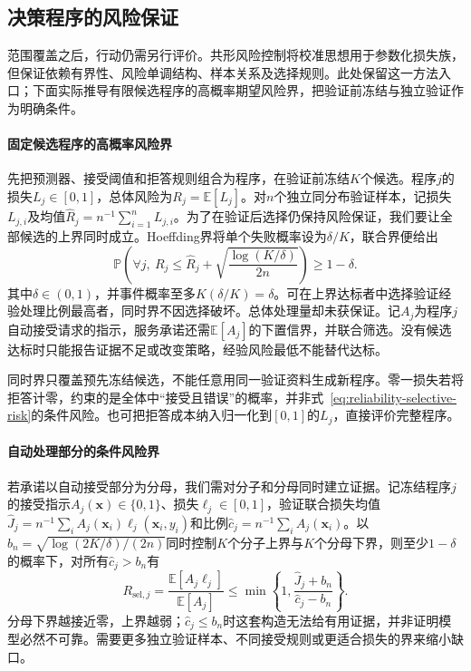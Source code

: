 \subsection{决策程序的风险保证}

范围覆盖之后，行动仍需另行评价。共形风险控制将校准思想用于参数化损失族，但保证依赖有界性、风险单调结构、样本关系及选择规则。此处保留这一方法入口；下面实际推导有限候选程序的高概率期望风险界，把验证前冻结与独立验证作为明确条件。

\paragraph{固定候选程序的高概率风险界}

先把预测器、接受阈值和拒答规则组合为程序，在验证前冻结$K$个候选。程序$j$的损失$L_j\in[0,1]$，总体风险为$R_j=\mathbb E[L_j]$。对$n$个独立同分布验证样本，记损失$L_{j,i}$及均值$\hat R_j=n^{-1}\sum_{i=1}^{n}L_{j,i}$。为了在验证后选择仍保持风险保证，我们要让全部候选的上界同时成立。Hoeffding界将单个失败概率设为$\delta/K$，联合界便给出
\begin{equation}
 \mathbb P\left(
  \forall j,\ R_j\leq
  \hat R_j+\sqrt{\frac{\log(K/\delta)}{2n}}
 \right)\geq1-\delta.
 \label{eq:reliability-finite-program-bound}
\end{equation}
其中$\delta\in(0,1)$，并事件概率至多$K(\delta/K)=\delta$。可在上界达标者中选择验证经验处理比例最高者，同时界不因选择破坏。总体处理量却未获保证。记$A_j$为程序$j$自动接受请求的指示，服务承诺还需$\mathbb E[A_j]$的下置信界，并联合筛选。没有候选达标时只能报告证据不足或改变策略，经验风险最低不能替代达标。

同时界只覆盖预先冻结候选，不能任意用同一验证资料生成新程序。零一损失若将拒答计零，约束的是全体中“接受且错误”的概率，并非式~\eqref{eq:reliability-selective-risk}的条件风险。也可把拒答成本纳入归一化到$[0,1]$的$L_j$，直接评价完整程序。

\paragraph{自动处理部分的条件风险界}

若承诺以自动接受部分为分母，我们需对分子和分母同时建立证据。记冻结程序$j$的接受指示$A_j(\bm{x})\in\{0,1\}$、损失$\ell_j\in[0,1]$，验证联合损失均值$\hat J_j=n^{-1}\sum_i A_j(\bm{x}_i)\ell_j(\bm{x}_i,y_i)$和比例$\hat c_j=n^{-1}\sum_i A_j(\bm{x}_i)$。以$b_n=\sqrt{\log(2K/\delta)/(2n)}$同时控制$K$个分子上界与$K$个分母下界，则至少$1-\delta$的概率下，对所有$\hat c_j>b_n$有
\begin{equation}
 R_{\mathrm{sel},j}
 =\frac{\mathbb E[A_j\ell_j]}{\mathbb E[A_j]}
 \leq\min\left\{1,\frac{\hat J_j+b_n}{\hat c_j-b_n}\right\}.
 \label{eq:reliability-conditional-risk-bound}
\end{equation}
分母下界越接近零，上界越弱；$\hat c_j\leq b_n$时这套构造无法给有用证据，并非证明模型必然不可靠。需要更多独立验证样本、不同接受规则或更适合损失的界来缩小缺口。

